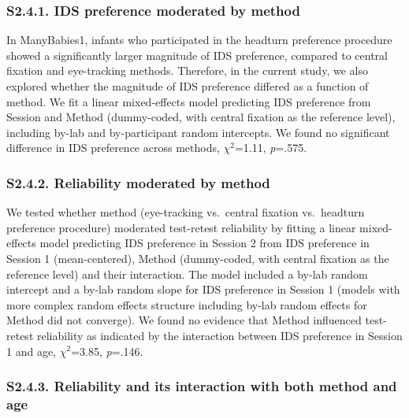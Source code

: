 \documentclass[
  man, donotrepeattitle,floatsintext]{apa6}
\begin{document}
\hypertarget{s2.4.1.-ids-preference-moderated-by-method}{%
\subsubsection{S2.4.1. IDS preference moderated by method}\label{s2.4.1.-ids-preference-moderated-by-method}}

In ManyBabies1, infants who participated in the headturn preference procedure showed a significantly larger magnitude of IDS preference, compared to central fixation and eye-tracking methods. Therefore, in the current study, we also explored whether the magnitude of IDS preference differed as a function of method. We fit a linear mixed-effects model predicting IDS preference from Session and Method (dummy-coded, with central fixation as the reference level), including by-lab and by-participant random intercepts. We found no significant difference in IDS preference across methods, \({\chi}^2\)=1.11, \emph{p}=.575.

\hypertarget{s2.4.2.-reliability-moderated-by-method}{%
\subsubsection{S2.4.2. Reliability moderated by method}\label{s2.4.2.-reliability-moderated-by-method}}

We tested whether method (eye-tracking vs.~central fixation vs.~headturn preference procedure) moderated test-retest reliability by fitting a linear mixed-effects model predicting IDS preference in Session 2 from IDS preference in Session 1 (mean-centered), Method (dummy-coded, with central fixation as the reference level) and their interaction.
The model included a by-lab random intercept and a by-lab random slope for IDS preference in Session 1 (models with more complex random effects structure including by-lab random effects for Method did not converge).
We found no evidence that Method influenced test-retest reliability as indicated by the interaction between IDS preference in Session 1 and age, \({\chi}^2\)=3.85, \emph{p}=.146.

\hypertarget{s2.4.3.-reliability-and-its-interaction-with-both-method-and-age}{%
\subsubsection{S2.4.3. Reliability and its interaction with both method and age}\label{s2.4.3.-reliability-and-its-interaction-with-both-method-and-age}}
\end{document}
